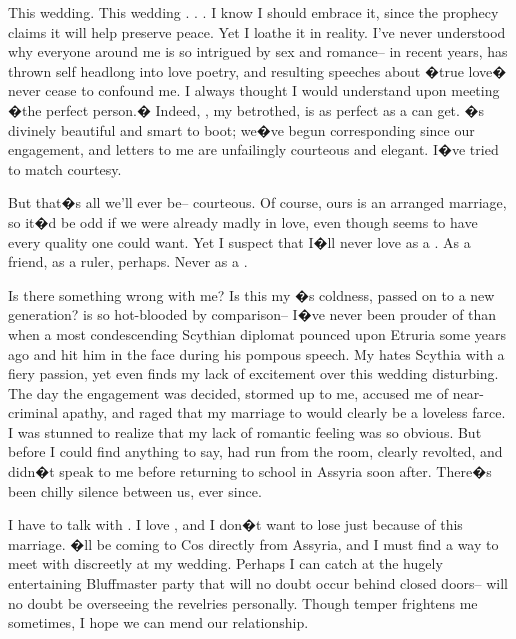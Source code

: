 \documentclass[char]{Kos}
\begin{document}
This wedding. This wedding . . . I know I should embrace it, since the prophecy claims it will help preserve peace. Yet I loathe it in reality. I've never understood why everyone around me is so intrigued by sex and romance-- in recent years, \cPoet{\nickname} has thrown \cPoet{\them}self headlong into love poetry, and \cPoet{\their} resulting speeches about �true love� never cease to confound me. I always thought I would understand upon meeting �the perfect person.� Indeed, \cBride{\nickname}, my betrothed, is as perfect as a \cBride{\human} can get. \cBride{\They}�s divinely beautiful and smart to boot; we�ve begun corresponding since our engagement, and \cBride{\their} letters to me are unfailingly courteous and elegant. I�ve tried to match \cBride{\their} courtesy. 

But that�s all we'll ever be-- courteous. Of course, ours is an arranged marriage, so it�d be odd if we were already madly in love, even though \cBride{\they} seems to have every quality one could want. Yet I suspect that I�ll never love \cBride{\them} as a \cBride{\spouse}. As a friend, as a ruler, perhaps. Never as a \cBride{\spouse}.

Is there something wrong with me? Is this my \cEtruriaKing{\parent}�s coldness, passed on to a new generation? \cPoet{\nickname} is so hot-blooded by comparison-- I�ve never been prouder of \cPoet{\them} than when a most condescending Scythian diplomat pounced upon Etruria some years ago and \cPoet{\they} hit him in the face during his pompous speech. My \cPoet{\sibling} hates Scythia with a fiery passion, yet even \cPoet{\they} finds my lack of excitement over this wedding disturbing. The day the engagement was decided, \cPoet{\they} stormed up to me, accused me of near-criminal apathy, and raged that my marriage to \cBride{\nickname} would clearly be a loveless farce. I was stunned to realize that my lack of romantic feeling was so obvious. But before I could find anything to say, \cPoet{\nickname} had run from the room, clearly revolted, and \cPoet{\they} didn�t speak to me before returning to school in Assyria soon after. There�s been chilly silence between us, ever since.

I have to talk with \cPoet{\nickname}. I love \cPoet{\them}, and I don�t want to lose \cPoet{\them} just because of this marriage. \cPoet{\They}�ll be coming to Cos directly from Assyria, and I must find a way to meet with \cPoet{\them} discreetly at my wedding. Perhaps I can catch \cPoet{\them} at the hugely entertaining Bluffmaster party that will no doubt occur behind closed doors-- \cPoet{\nickname} will no doubt be overseeing the revelries personally. Though \cPoet{\their} temper frightens me sometimes, I hope we can mend our relationship.
\end{document}
